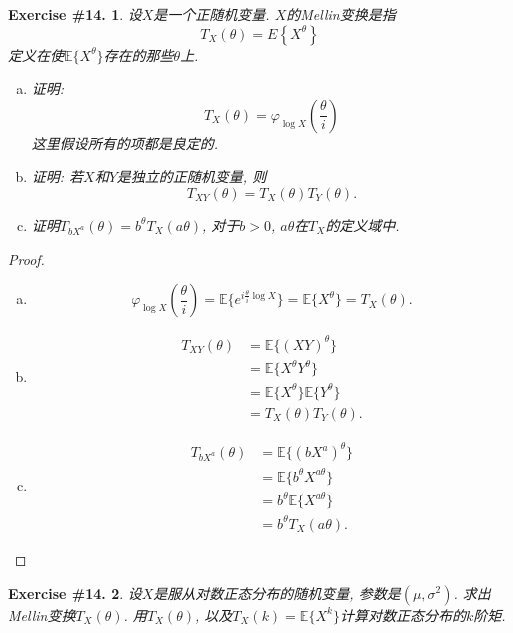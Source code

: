 \documentclass[UTF8, a4paper]{article}
\newtheorem{exercise}{Exercise \#14.}
\begin{document}
\begin{framed}
\begin{exercise}
设\(X\)是一个正随机变量. \(X\)的Mellin变换是指
$$
T_X(\theta)=E\left\{X^\theta\right\}
$$
定义在使\(\mathbb{E}\{X^\theta\}\)存在的那些\(\theta\)上.
\begin{enumerate}[a)]
    \item 证明: $$
T_X(\theta)=\varphi_{\log X}\left(\frac{\theta}{i}\right)
$$
这里假设所有的项都是良定的.
\item 证明: 若\(X\)和\(Y\)是独立的正随机变量, 则$$
T_{X Y}(\theta)=T_X(\theta) T_Y(\theta) .
$$
\item 证明\(T_{bX^a}(\theta) = b^\theta T_X(a\theta)\), 对于\(b>0\), \(a\theta\)在\(T_X\)的定义域中.
\end{enumerate}
\end{exercise}
\end{framed}

\begin{proof}
\begin{enumerate}[a)]
\item $$
\varphi_{\log X}\left(\frac{\theta}{i}\right) = \mathbb{E}\{e^{i\frac{\theta}{i} \log X}\} = \mathbb{E}\{X^\theta\} = T_X(\theta).
$$
\item $$
\begin{aligned}
    T_{XY}(\theta) &= \mathbb{E}\{(XY)^\theta\} \\
    &= \mathbb{E}\{X^\theta Y^\theta\} \\
    &= \mathbb{E}\{X^\theta\} \mathbb{E}\{Y^\theta\} \\
    &= T_X(\theta) T_Y(\theta).
\end{aligned}
$$
\item $$
\begin{aligned}
    T_{bX^a}(\theta) &= \mathbb{E}\{(bX^a)^\theta\} \\
    &= \mathbb{E}\{b^\theta X^{a\theta}\} \\
    &= b^\theta \mathbb{E}\{X^{a\theta}\} \\
    &= b^\theta T_X(a\theta).
\end{aligned}
$$
\end{enumerate}
\end{proof}



\begin{framed}
\begin{exercise}
设\(X\)是服从对数正态分布的随机变量, 参数是\((\mu, \sigma^2)\). 求出Mellin变换\(T_X(\theta)\).
用\(T_X(\theta)\), 以及\(T_X(k) = \mathbb{E}\{X^k\}\)计算对数正态分布的\(k\)阶矩.
\end{exercise}
\end{framed}
\end{document}
